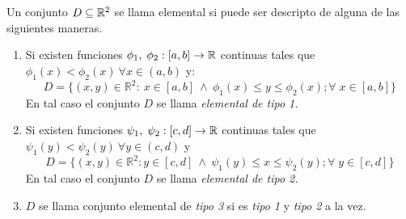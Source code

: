 \begin{definition}\label{conj_elem}  Un conjunto  $D\subseteq\mathbb{R}^2$ se llama elemental si  puede ser descripto de alguna de las siguientes maneras. 
   
    \begin{enumerate}
    \item[i.] Si  existen funciones $\phi_1,\;\phi_2:[a,b]\to\mathbb{R}$  continuas  tales que $ \phi_1(x) < \phi_2(x) \: \forall x \in (a,b) $  y:
    \begin{equation}\label{def:tipo1}
     D = \{ (x,y) \in \mathbb{R}^{2}: \:   x\in[a,b] \: \land \: \phi_1(x)\leq y\leq\phi_2(x) ;\forall\;x\in[a,b] \}  
     \end{equation}   En tal caso  el conjunto $D$ se llama  \textit{elemental de tipo 1.} 
   
    \item[ii.]Si existen funciones $\psi_1,\;\psi_2:[c,d]\to\mathbb{R}$  continuas tales que $ \psi_1(y) < \psi_2(y) \: \forall y \in (c,d)$ y 
    \begin{equation}\label{def:tipo2}
     D = \{ (x,y) \in \mathbb{R}^{2}:   y\in[c,d] \: \land \:  \psi_1(y)\leq x\leq\psi_2(y) ;\forall\;y\in[c,d] \}  
     \end{equation}
     En tal caso el conjunto $D$  se llama  \textit{elemental de tipo 2.} 
    
    \item[iii.] $D$ se llama conjunto elemental de \textit{tipo 3} si es \textit{tipo 1} y \textit{tipo 2} a la vez.
    
    
    
    \end{enumerate}
\end{definition}

